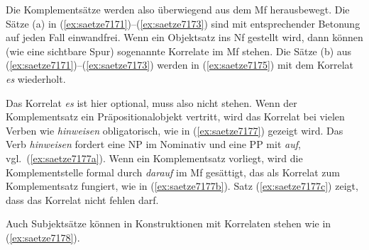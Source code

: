 Die Komplementsätze werden also überwiegend aus dem Mf herausbewegt.
Die Sätze (a) in (\ref{ex:saetze7171})--(\ref{ex:saetze7173}) sind mit entsprechender Betonung auf jeden Fall einwandfrei.
Wenn ein Objektsatz ins Nf gestellt wird, dann können (wie eine sichtbare Spur) sogenannte Korrelate im Mf stehen.
Die Sätze (b) aus (\ref{ex:saetze7171})--(\ref{ex:saetze7173}) werden in (\ref{ex:saetze7175}) mit dem Korrelat \textit{es} wiederholt.

\begin{exe}
  \ex\label{ex:saetze7175}
  \begin{xlist}
  \end{xlist}
\end{exe}

Das Korrelat \textit{es} ist hier optional, muss also nicht stehen.
Wenn der Komplementsatz ein Präpositionalobjekt vertritt, wird das Korrelat bei vielen Verben wie \textit{hinweisen} obligatorisch, wie in (\ref{ex:saetze7177}) gezeigt wird.
Das Verb \textit{hinweisen} fordert eine NP im Nominativ und eine PP mit \textit{auf}, vgl.\ (\ref{ex:saetze7177a}).
Wenn ein Komplementsatz vorliegt, wird die Komplementstelle formal durch \textit{darauf} im Mf gesättigt, das als Korrelat zum Komplementsatz fungiert, wie in (\ref{ex:saetze7177b}).
Satz (\ref{ex:saetze7177c}) zeigt, dass das Korrelat nicht fehlen darf.

\begin{exe}
  \ex\label{ex:saetze7177}
  \begin{xlist}
  \end{xlist}
\end{exe}

Auch Subjektsätze können in Konstruktionen mit Korrelaten stehen wie in (\ref{ex:saetze7178}).

\begin{exe}
  \ex\label{ex:saetze7178}
  \begin{xlist}
  \end{xlist}
\end{exe}

